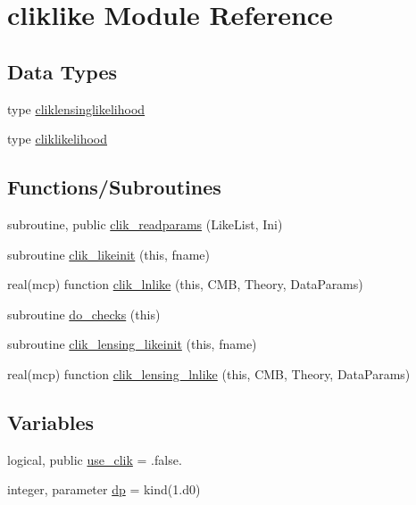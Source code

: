 \hypertarget{namespacecliklike}{}\section{cliklike Module Reference}
\label{namespacecliklike}
\subsection*{Data Types}
\begin{DoxyCompactItemize}
\item 
type \mbox{\hyperlink{structcliklike_1_1cliklensinglikelihood}{cliklensinglikelihood}}
\item 
type \mbox{\hyperlink{structcliklike_1_1cliklikelihood}{cliklikelihood}}
\end{DoxyCompactItemize}
\subsection*{Functions/\+Subroutines}
\begin{DoxyCompactItemize}
\item 
subroutine, public \mbox{\hyperlink{namespacecliklike_afd6ed043a70bb783b9840d5569cb85bb}{clik\+\_\+readparams}} (Like\+List, Ini)
\item 
subroutine \mbox{\hyperlink{namespacecliklike_a093a22f8a8a490ec917ebc7a92c27c2b}{clik\+\_\+likeinit}} (this, fname)
\item 
real(mcp) function \mbox{\hyperlink{namespacecliklike_a8fa2426732ea59e352d0c0e13011fe62}{clik\+\_\+lnlike}} (this, C\+MB, Theory, Data\+Params)
\item 
subroutine \mbox{\hyperlink{namespacecliklike_ab304afaa9dfed7a5bfa3d0827bce1b4d}{do\+\_\+checks}} (this)
\item 
subroutine \mbox{\hyperlink{namespacecliklike_af1724949f007a273de7b121db709494d}{clik\+\_\+lensing\+\_\+likeinit}} (this, fname)
\item 
real(mcp) function \mbox{\hyperlink{namespacecliklike_ad4622dfac7ccf0cffb96b6b9d1e097d9}{clik\+\_\+lensing\+\_\+lnlike}} (this, C\+MB, Theory, Data\+Params)
\end{DoxyCompactItemize}
\subsection*{Variables}
\begin{DoxyCompactItemize}
\item 
logical, public \mbox{\hyperlink{namespacecliklike_ab3a813fb756b21053772e9783f44ee73}{use\+\_\+clik}} = .false.
\item 
integer, parameter \mbox{\hyperlink{namespacecliklike_a809e60ab23d53a4785481b88524bf355}{dp}} = kind(1.d0)
\end{DoxyCompactItemize}


